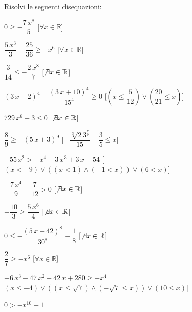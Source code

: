 \begin{esercizio}\label{ese:03.1}
Risolvi le seguenti disequazioni:
\begin{enumeratea}
\item \(0\geq -{\dfrac{7\,{x}^{8}}{5}}\) 
\hfill [\(\forall x \in \mathbb{R}\)]
\item \({\dfrac{5\,{x}^{3}}{3}}+{\dfrac{25}{36}}\geq -{x}^{6}\) 
\hfill [\(\forall x \in \mathbb{R}\)]
\item \({\dfrac{3}{14}}\leq -{\dfrac{2\,{x}^{8}}{7}}\) 
\hfill [\(\not\exists x \in \mathbb{R}\)]
\item \( \left( 3\,x-2 \right) ^{4}-{\dfrac{ \left( 3\,x+10 \right) 
^{4}}{15^4}}\geq 0\) 
\hfill [\((x\leq {\dfrac{5}{12}})\vee ({\dfrac{20}{21}}\leq x)\)]
\item \(729\,{x}^{6}+3\leq 0\) 
\hfill [\(\not\exists x \in \mathbb{R}\)]
\item \({\dfrac{8}{9}}\geq - \left( 5\,x+3 \right) ^{9}\) 
\hfill [\(-{\dfrac{\sqrt [3]{2}{3}^{{\frac{7}{9}}}}{15}}-{\dfrac
{3}{5}}\leq x\)]
\item \(-55\,{x}^{2}>-{x}^{4}-3\,{x}^{3}+3\,x-54\) 
\hfill [\((x<-9)\vee ((x<1) \wedge (-1<x))\vee (6<x)\)]
\item \(-{\dfrac{7\,{x}^{4}}{9}}-{\dfrac{7}{12}}>0\) 
\hfill [\(\not\exists x \in \mathbb{R}\)]
\item \(-{\dfrac{10}{3}}\geq {\dfrac{5\,{x}^{6}}{4}}\) 
\hfill [\(\not\exists x \in \mathbb{R}\)]
\item \(0\leq -{\dfrac{ \left( 5\,x+42 \right) ^{8}}{30^8}}-{\dfrac
{1}{8}}\) 
\hfill [\(\not\exists x \in \mathbb{R}\)]
\item \({\dfrac{2}{7}}\geq -{x}^{6}\) 
\hfill [\(\forall x \in \mathbb{R}\)]
\item \(-6\,{x}^{3}-47\,{x}^{2}+42\,x+280\geq -{x}^{4}\) 
\hfill [\((x\leq -4)\vee ((x\leq \sqrt {7}) \wedge (-\sqrt {7}\leq x))\vee 
(10\leq x)\)]
\item \(0>-{x}^{10}-1\) 

\end{enumeratea}
\end{esercizio}
